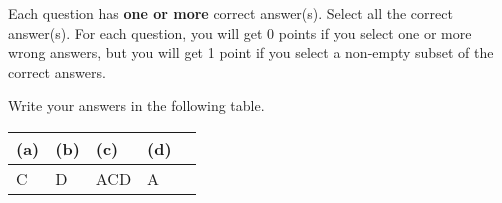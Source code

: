 
Each question has \textbf{one or more} correct answer(s). Select all the correct answer(s). For each question, you will get 0 points if you select one or more wrong answers, but you will get 1 point if you select a non-empty subset of the correct answers.

Write your answers in the following table.


\begin{table}[htbp]
	\centering
	\begin{tabular}{|p{2cm}|p{2cm}|p{2cm}|p{2cm}|p{6cm}|}
		\hline
		(a) & (b) & (c) & (d)\\
		\hline
		C  &  D   & ACD  & A \\
		\hline
	\end{tabular}
\end{table}

